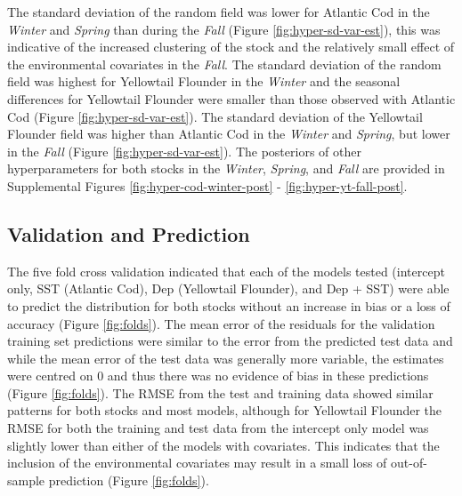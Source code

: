 \documentclass[
]{article}
\begin{document}
The standard deviation of the random field was lower for Atlantic Cod in the \emph{Winter} and \emph{Spring} than during the \emph{Fall} (Figure \ref{fig:hyper-sd-var-est}), this was indicative of the increased clustering of the stock and the relatively small effect of the environmental covariates in the \emph{Fall}. The standard deviation of the random field was highest for Yellowtail Flounder in the \emph{Winter} and the seasonal differences for Yellowtail Flounder were smaller than those observed with Atlantic Cod (Figure \ref{fig:hyper-sd-var-est}). The standard deviation of the Yellowtail Flounder field was higher than Atlantic Cod in the \emph{Winter} and \emph{Spring}, but lower in the \emph{Fall} (Figure \ref{fig:hyper-sd-var-est}). The posteriors of other hyperparameters for both stocks in the \emph{Winter}, \emph{Spring}, and \emph{Fall} are provided in Supplemental Figures \ref{fig:hyper-cod-winter-post} - \ref{fig:hyper-yt-fall-post}.

\hypertarget{validation-and-prediction}{%
\subsection{Validation and Prediction}\label{validation-and-prediction}}

The five fold cross validation indicated that each of the models tested (intercept only, SST (Atlantic Cod), Dep (Yellowtail Flounder), and Dep + SST) were able to predict the distribution for both stocks without an increase in bias or a loss of accuracy (Figure \ref{fig:folds}). The mean error of the residuals for the validation training set predictions were similar to the error from the predicted test data and while the mean error of the test data was generally more variable, the estimates were centred on 0 and thus there was no evidence of bias in these predictions (Figure \ref{fig:folds}). The RMSE from the test and training data showed similar patterns for both stocks and most models, although for Yellowtail Flounder the RMSE for both the training and test data from the intercept only model was slightly lower than either of the models with covariates. This indicates that the inclusion of the environmental covariates may result in a small loss of out-of-sample prediction (Figure \ref{fig:folds}).
\end{document}

